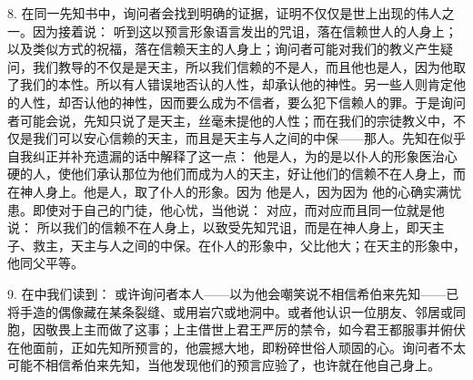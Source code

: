 8. 在同一先知书中，询问者会找到明确的证据，证明不仅仅是世上出现的伟人之一。因为接着说： 听到这以预言形象语言发出的咒诅，落在信赖世人的人身上；以及类似方式的祝福，落在信赖天主的人身上；询问者可能对我们的教义产生疑问，我们教导的不仅是是天主，所以我们信赖的不是人，而且他也是人，因为他取了我们的本性。所以有人错误地否认的人性，却承认他的神性。另一些人则肯定他的人性，却否认他的神性，因而要么成为不信者，要么犯下信赖人的罪。于是询问者可能会说，先知只说了是天主，丝毫未提他的人性；而在我们的宗徒教义中，不仅是我们可以安心信赖的天主，而且是天主与人之间的中保——那人。先知在似乎自我纠正并补充遗漏的话中解释了这一点： 他是人，为的是以仆人的形象医治心硬的人，使他们承认那位为他们而成为人的天主，好让他们的信赖不在人身上，而在神人身上。他是人，取了仆人的形象。因为 他是人，因为因为 他的心确实满忧患。即使对于自己的门徒，他心忧，当他说： 对应，而对应而且同一位就是他说： 所以我们的信赖不在人身上，以致受先知咒诅，而是在神人身上，即天主子、救主，天主与人之间的中保。在仆人的形象中，父比他大；在天主的形象中，他同父平等。\par

9. 在中我们读到： 或许询问者本人——以为他会嘲笑说不相信希伯来先知——已将手造的偶像藏在某条裂缝、或用岩穴或地洞中。或者他认识一位朋友、邻居或同胞，因敬畏上主而做了这事；上主借世上君王严厉的禁令，如今君王都服事并俯伏在他面前，正如先知所预言的，他震撼大地，即粉碎世俗人顽固的心。询问者不太可能不相信希伯来先知，当他发现他们的预言应验了，也许就在他自己身上。\par

